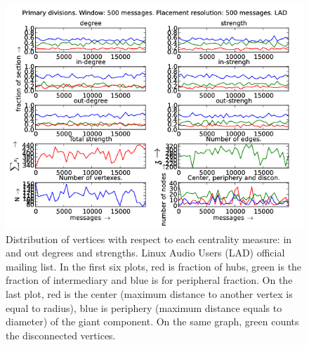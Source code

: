 \documentclass[%
 aip,
 jmp,%
 amsmath,amssymb,
 reprint,%
]{revtex4-1}
\begin{document}
\begin{figure}[hbtp] 
   \centering
        \includegraphics[width=\textwidth]{figs/LAD/500}
    \caption{Distribution of vertices with respect to each centrality measure: in and out degrees and strengths. Linux Audio Users (LAD) official mailing list. In the first six plots, red is fraction of hubs, green is the fraction of intermediary and blue is for peripheral fraction. On the last plot, red is the center (maximum distance to another vertex is equal to radius), blue is periphery (maximum distance equals to diameter) of the giant component. On the same graph, green counts the disconnected vertices.}
    \label{fig:lad500}
\end{figure}
\end{document}
